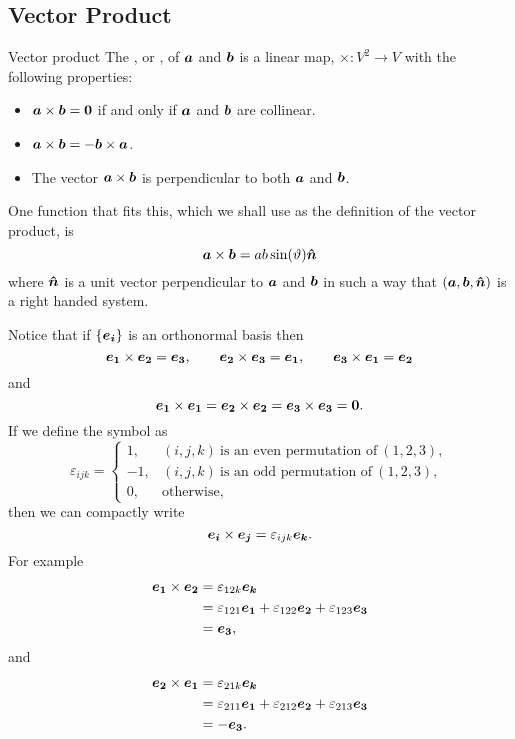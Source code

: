 \documentclass[a4paper]{article}
\begin{document}
    \subsection{Vector Product}
    \begin{definition}{Vector product}{}
        The , or , of \(\bm{a}\) and \(\bm{b}\) is a linear map, \(\times\colon V^2\to V\) with the following properties:
        \begin{itemize}
            \item \(\bm{a} \times \bm{b} = \bm{0}\) if and only if \(\bm{a}\) and \(\bm{b}\) are collinear.
            \item \(\bm{a} \times \bm{b} = - \bm{b} \times \bm{a}\).
            \item The vector \(\bm{a}\times\bm{b}\) is perpendicular to both \(\bm{a}\) and \(\bm{b}\).
        \end{itemize}
        One function that fits this, which we shall use as the definition of the vector product, is
        \[\bm{a}\times\bm{b} = ab\sin(\vartheta)\bm{\hat{n}}\]
        where \(\bm{\hat{n}}\) is a unit vector perpendicular to \(\bm{a}\) and \(\bm{b}\) in such a way that \((\bm{a}, \bm{b}, \bm{\hat{n}})\) is a right handed system.
    \end{definition}
    Notice that if \(\{\bm{e_{i}}\}\) is an orthonormal basis then
    \[\bm{e_{1}}\times\bm{e_{2}} = \bm{e_{3}}, \qquad \bm{e_{2}}\times\bm{e_{3}} = \bm{e_{1}}, \qquad \bm{e_{3}}\times\bm{e_{1}} = \bm{e_{2}}\]
    and
    \[\bm{e_{1}}\times\bm{e_{1}} = \bm{e_{2}}\times\bm{e_{2}} = \bm{e_{3}}\times\bm{e_{3}} = \bm{0}.\]
    If we define the  symbol as
    \[
        \varepsilon_{ijk} = 
        \begin{cases}
            1, & (i, j, k)~\text{is an even permutation of}~(1, 2, 3),\\
            -1, & (i, j, k)~\text{is an odd permutation of}~(1, 2, 3),\\
            0, & \text{otherwise},
        \end{cases}
    \]
    then we can compactly write
    \[\bm{e_{i}}\times\bm{e_{j}} = \varepsilon_{ijk}\bm{e_{k}}.\]
    For example
    \begin{align*}
        \bm{e_{1}}\times\bm{e_{2}} &= \varepsilon_{12k}\bm{e_{k}}\\
        &= \varepsilon_{121}\bm{e_{1}} + \varepsilon_{122}\bm{e_{2}} + \varepsilon_{123}\bm{e_{3}}\\
        &= \bm{e_{3}},
    \end{align*}
    and
    \begin{align*}
        \bm{e_{2}}\times\bm{e_{1}} &= \varepsilon_{21k}\bm{e_{k}}\\
        &= \varepsilon_{211}\bm{e_{1}} + \varepsilon_{212}\bm{e_{2}} + \varepsilon_{213}\bm{e_{3}}\\
        &= -\bm{e_{3}}.
    \end{align*}
\end{document}
